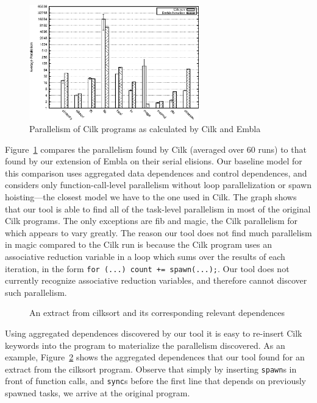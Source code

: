 \begin{figure}
 \centering
 \includegraphics[width=2.9in]{cilk-run}
 \caption{Parallelism of Cilk programs as calculated by Cilk and Embla}
 \label{cilk-run}
\end{figure}

Figure~\ref{cilk-run} compares the parallelism found by Cilk (averaged over 60 runs) to that found by our extension of Embla on their serial elisions.
Our baseline model for this comparison uses aggregated data dependences and control dependences, and considers only function-call-level parallelism without loop parallelization or spawn hoisting---the closest model we have to the one used in Cilk.
The graph shows that our tool is able to find all of the task-level parallelism in most of the original Cilk programs.
The only exceptions are \textsf{fib} and \textsf{magic}, the Cilk parallelism for which appears to vary greatly.
The reason our tool does not find much parallelism in \textsf{magic} compared to the Cilk run is because the Cilk program uses an associative reduction variable in a loop which sums over the results of each iteration, in the form \texttt{for (...) count += spawn(...);}.
Our tool does not currently recognize associative reduction variables, and therefore cannot discover such parallelism.

\begin{figure}[t]
  \begin{center}
  \scriptsize
  
  \end{center}
  \nocaptionrule \caption{An extract from \textsf{cilksort} and its corresponding relevant dependences}
  \label{cilksort-depgraph}
\end{figure}

Using aggregated dependences discovered by our tool it is easy to re-insert Cilk keywords into the program to materialize the parallelism discovered.
As an example, Figure~\ref{cilksort-depgraph} shows the aggregated dependences that our tool found for an extract from the \textsf{cilksort} program.
Observe that simply by inserting \texttt{spawn}s in front of function calls, and \texttt{sync}s before the first line that depends on previously spawned tasks, we arrive at the original program.

